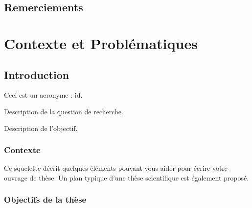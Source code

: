 \documentclass[french]{spimutbmphdthesis}
\begin{document}
 
\frontmatter

\chapter*{Remerciements}
 
\tableofcontents

\printacronyms

\mainmatter
 
\part{Contexte et Problématiques}

\chapter{Introduction}
 
Ceci est un acronyme : \ac{id}.

\begin{researchquestion}[un nom]
   Description de la question de recherche.
\end{researchquestion}

\begin{objective}[un nom]
   Description de l'objectif.
\end{objective}
 
\section{Contexte}

Ce squelette décrit quelques éléments pouvant vous aider pour écrire votre ouvrage de thèse.
Un plan typique d'une thèse scientifique est également proposé.

\section{Objectifs de la thèse}
\end{document}
